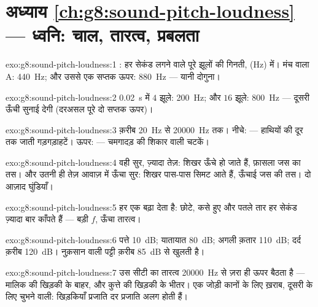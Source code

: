 \section*{अध्याय \ref{ch:g8:sound-pitch-loudness} --- ध्वनि: चाल, तारत्व, प्रबलता}

\begin{solution}{exo:g8:sound-pitch-loudness:1}
: हर सेकंड लगने वाले पूरे झूलों की गिनती,  (\unit{Hz})
में। मंच वाला A: \qty{440}{Hz}; और उससे एक सप्तक ऊपर:
\qty{880}{Hz} --- यानी दोगुना।
\end{solution}

\begin{solution}{exo:g8:sound-pitch-loudness:2}
\qty{0.02}{s} में $4$ झूले: \qty{200}{Hz}; और $16$ झूले:
\qty{800}{Hz} --- दूसरी ऊँची सुनाई देगी (दरअसल पूरे दो सप्तक ऊपर)।
\end{solution}

\begin{solution}{exo:g8:sound-pitch-loudness:3}
क़रीब \qty{20}{Hz} से \qty{20000}{Hz} तक। नीचे:  ---
हाथियों की दूर तक जाती गड़गड़ाहटें। ऊपर:  --- चमगादड़
की शिकार वाली चटकें।
\end{solution}

\begin{solution}{exo:g8:sound-pitch-loudness:4}
वही सुर, ज़्यादा तेज़: शिखर ऊँचे हो जाते हैं, फ़ासला जस का तस। और
उतनी ही तेज़ आवाज़ में ऊँचा सुर: शिखर पास-पास सिमट आते हैं, ऊँचाई जस
की तस। दो आज़ाद घुंडियाँ।
\end{solution}

\begin{solution}{exo:g8:sound-pitch-loudness:5}
हर एक  बढ़ा देता है: छोटे, कसे हुए और पतले तार हर सेकंड
ज़्यादा बार काँपते हैं --- बड़ी $f$, ऊँचा तारत्व।
\end{solution}

\begin{solution}{exo:g8:sound-pitch-loudness:6}
पत्ते \qty{10}{dB}; यातायात \qty{80}{dB}; अगली क़तार \qty{110}{dB};
दर्द क़रीब \qty{120}{dB}। नुक़सान वाली पट्टी क़रीब \qty{85}{dB} से
खुलती है।
\end{solution}

\begin{solution}{exo:g8:sound-pitch-loudness:7}
उस सीटी का तारत्व \qty{20000}{Hz} से ज़रा ही ऊपर बैठता है ---
मालिक की खिड़की के बाहर, और कुत्ते की खिड़की के भीतर। एक जोड़ी कानों
के लिए ख़राब, दूसरी के लिए चुभने वाली: खिड़कियाँ प्रजाति दर प्रजाति
अलग होती हैं।
\end{solution}

